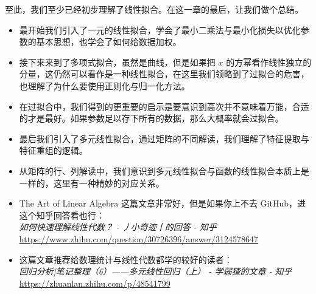 至此，我们至少已经初步理解了线性拟合。在这一章的最后，让我们做个总结。

\begin{itemize}
    \item 最开始我们引入了一元的线性拟合，学会了最小二乘法与最小化损失以优化参数的基本思想，也学会了如何给数据加权。
    \item 接下来来到了多项式拟合，虽然是曲线，但是如果把 $x$ 的方幂看作线性独立的分量，这仍然可以看作是一种线性拟合，在这里我们领略到了过拟合的危害，也理解了为什么要使用正则化与归一化方法。
    \item 在过拟合中，我们得到的更重要的启示是要意识到高次并不意味着万能，合适的才是最好。如果参数足以存下所有的数据，那么大概率就会过拟合。
    \item 最后我们引入了多元线性拟合，通过矩阵的不同解读，我们理解了特征提取与特征重组的逻辑。
    \item 从矩阵的行、列解读中，我们意识到多元线性拟合与函数的线性拟合本质上是一样的，这里有一种精妙的对应关系。
\end{itemize}

\begin{tcolorbox}[myrecommendbox, title=推荐阅读, breakable=false]
    \begin{itemize}
        \item The Art of Linear Algebra 这篇文章非常好，但是如果你上不去 GitHub，进这个知乎回答看也行：\\
              \textit{如何快速理解线性代数？ - 丿小奇迹丨的回答 - 知乎}\\
              \url{https://www.zhihu.com/question/30726396/answer/3124578647}
            \item 这篇文章推荐给数理统计与线性代数都学的较好的读者：\\
                  \textit{回归分析|笔记整理（6）——多元线性回归（上） - 学弱猹的文章 - 知乎}\\
                  \url{https://zhuanlan.zhihu.com/p/48541799}
    \end{itemize}
\end{tcolorbox}